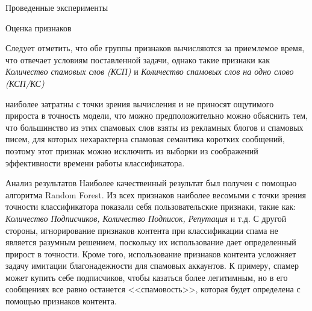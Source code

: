 \begin{section}{Проведенные эксперименты}
\begin{subsection}{Оценка признаков}
\begin{table}[H]
\caption{Время вычисления признаков}
\label{tab:comptime}
\end{table}

Следует отметить, что обе группы признаков вычисляются за приемлемое время, что отвечает условиям поставленной задачи, однако такие признаки как \textit{Количество спамовых слов (КСП)} и \textit{Количество спамовых слов на одно слово (КСП/КС)}
\end{subsection} наиболее затратны с точки зрения вычисления и не приносят ощутимого прироста в точность модели, что можно предположительно можно обьяснить тем, что большинство из этих спамовых слов взяты из рекламных блогов и спамовых писем, для которых нехарактерна спамовая семантика коротких сообщений, поэтому этот признак можно исключить из выборки из соображений эффективности времени работы классификатора.


\begin{subsection}{Анализ результатов}
Наиболее качественный результат был получен с помощью алгоритма Random Forest. Из всех признаков наиболее весомыми с точки зрения точности классификатора показали себя пользовательские признаки, такие как: \textit{Количество Подписчиков, Количество Подписок, Репутация} и т.д. С другой стороны, игнорирование признаков контента при классификации спама не является разумным решением, поскольку их использование дает определенный прирост в точности. Кроме того, использование признаков контента усложняет задачу имитации благонадежности для спамовых аккаунтов. К примеру, спамер может купить себе подписчиков, чтобы казаться более легитимным, но в его сообщениях все равно останется <<спамовость>>, которая будет определена с помощью признаков контента.
\end{subsection}









\end{section}
